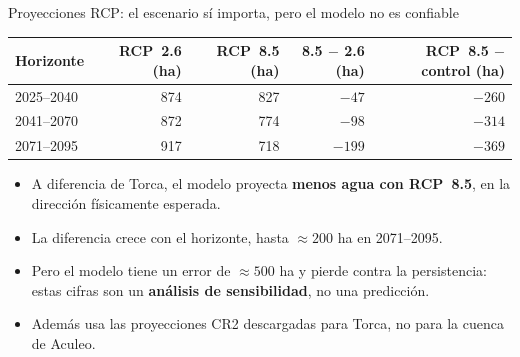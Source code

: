 \documentclass[10pt]{beamer}
\newcommand{\dato}[1]{\textbf{\color{blue!60!black}#1}}
\begin{document}
\begin{frame}{Proyecciones RCP: el escenario sí importa, pero el modelo no es confiable}
\centering
\footnotesize
\begin{tabular}{lrrrr}
\toprule
Horizonte & RCP~2.6 (ha) & RCP~8.5 (ha) & 8.5 $-$ 2.6 (ha) & RCP~8.5 $-$ control (ha) \\
\midrule
2025--2040 & 874 & 827 & $-47$ & $-260$ \\
2041--2070 & 872 & 774 & $-98$ & $-314$ \\
2071--2095 & 917 & 718 & \dato{$-199$} & $-369$ \\
\bottomrule
\end{tabular}
\vspace{3mm}
\begin{itemize}
\item A diferencia de Torca, el modelo proyecta \textbf{menos agua con RCP~8.5}, en la dirección físicamente esperada.
\item La diferencia crece con el horizonte, hasta ${\approx}200$ ha en 2071--2095.
\item Pero el modelo tiene un error de ${\approx}500$ ha y pierde contra la persistencia: estas cifras son un \textbf{análisis de sensibilidad}, no una predicción.
\item Además usa las proyecciones CR2 descargadas para Torca, no para la cuenca de Aculeo.
\end{itemize}
\end{frame}
\end{document}
